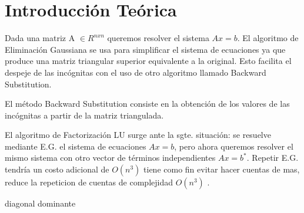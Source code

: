 \section{Introducción Teórica}

Dada una matriz A $\in R^{nxn}$ queremos resolver el sistema $Ax = b$. El algoritmo de Eliminación Gaussiana se usa para simplificar el sistema de ecuaciones ya que produce una matriz triangular superior equivalente a la original. Esto facilita el despeje de las incógnitas con el uso de otro algoritmo llamado Backward Substitution.

El método Backward Substitution consiste en la obtención de los valores de las incógnitas a partir de la matriz triangulada.

El algoritmo de Factorización LU surge ante la sgte. situación: se resuelve mediante E.G. el sistema de ecuaciones $Ax = b$, pero ahora queremos resolver el mismo sistema con otro vector de términos independientes $Ax = b^{*}$. Repetir E.G. tendría un costo adicional de $O(n^{3})$ tiene como fin evitar hacer cuentas de mas, reduce la repeticion de cuentas de complejidad $O(n^{3})$ .

diagonal dominante


